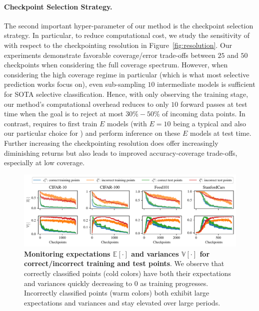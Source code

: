 \paragraph{Checkpoint Selection Strategy.} The second important hyper-parameter of our method is the checkpoint selection strategy. In particular, to reduce computational cost, we study the sensitivity of \sptd with respect to the checkpointing resolution in Figure~\ref{fig:resolution}. Our experiments demonstrate favorable coverage/error trade-offs between $25$ and $50$ checkpoints when considering the full coverage spectrum. However, when considering the high coverage regime in particular (which is what most selective prediction works focus on), even sub-sampling $10$ intermediate models is sufficient for SOTA selective classification. Hence, with only observing the training stage, our method's computational overhead reduces to only $10$ forward passes at test time when the goal is to reject at most $30\%-50\%$ of incoming data points. In contrast, \de requires to first train $E$ models (with $E=10$ being a typical and also our particular choice for \de) and perform inference on these $E$ models at test time. Further increasing the checkpointing resolution does offer increasingly diminishing returns but also leads to improved accuracy-coverage trade-offs, especially at low coverage.

\begin{figure}[t]
  \centering
  \includegraphics[width=\linewidth]{figs/sptd/et_vt_updated.pdf}
\caption[Monitoring expectations and variances for correct/incorrect training and test points.]{\textbf{Monitoring expectations $\mathbb{E}[\cdot]$ and variances $\mathbb{V}[\cdot]$ for correct/incorrect training and test points}. We observe that correctly classified points (cold colors) have both their expectations and variances quickly decreasing to 0 as training progresses. Incorrectly classified points (warm colors) both exhibit large expectations and variances and stay elevated over large periods.}
\label{fig:exp_var_trends}
\end{figure}


